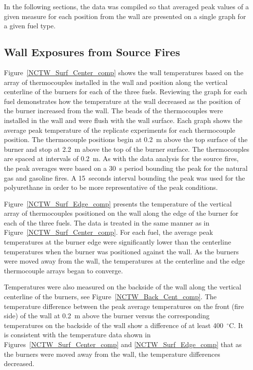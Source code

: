 \documentclass[twoside]{uocthesis}
\begin{document}
{In the following sections, the data was compiled so that averaged peak values of a given measure for each position from the wall are presented on a single graph for a given fuel type.

\subsection{Wall Exposures from Source Fires}

Figure~\ref{NCTW_Surf_Center_comp} shows the wall temperatures based on the array of thermocouples installed in the wall and position along the vertical centerline of the burners for each of the three fuels. Reviewing the graph for each fuel demonstrates how the temperature at the wall decreased as the position of the burner increased from the wall. The beads of the thermocouples were installed in the wall and were flush with the wall surface. Each graph shows the average peak temperature of the replicate experiments for each thermocouple position.  The thermocouple positions begin at 0.2~m above the top surface of the burner and stop at 2.2~m above the top of the burner surface. The thermocouples are spaced at intervals of 0.2~m. As with the data analysis for the source fires, the peak averages were based on a 30~s period bounding the peak for the natural gas and gasoline fires.  A 15~seconds interval bounding the peak was used for the polyurethane in order to be more representative of the peak conditions.

Figure~\ref{NCTW_Surf_Edge_comp} presents the temperature of the vertical array of thermocouples positioned on the wall along the edge of the burner for each of the three fuels.  The data is treated in the same manner as in Figure~\ref{NCTW_Surf_Center_comp}.  For each fuel, the average peak temperatures at the burner edge were significantly lower than the centerline temperatures when the burner was positioned against the wall.  As the burners were moved away from the wall, the temperatures at the centerline and the edge thermocouple arrays began to converge.

Temperatures were also measured on the backside of the wall along the vertical centerline of the burners, see Figure~\ref{NCTW_Back_Cent_comp}. The temperature difference between the peak average temperatures on the front (fire side) of the wall at 0.2~m above the burner versus the corresponding temperatures on the backside of the wall show a difference of at least 400~$^\circ$C.  It is consistent with the temperature data shown in Figures~\ref{NCTW_Surf_Center_comp} and \ref{NCTW_Surf_Edge_comp} that as the burners were moved away from the wall, the temperature differences decreased.

}
\end{document}
